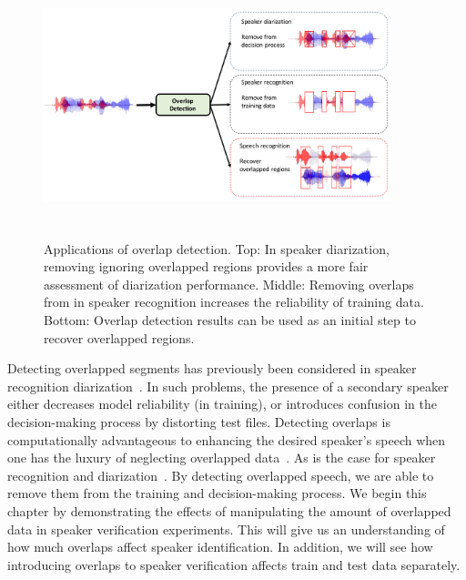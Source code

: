 \begin{figure}[h!]
	\centering
	\vspace{0mm}
	\includegraphics[height = 3in, width=0.9\textwidth]{figures/overlap_detection_applications}
	\vspace{-3mm}
	\caption{Applications of overlap detection. Top: In speaker diarization, removing ignoring overlapped regions provides a more fair assessment of diarization performance. Middle: Removing overlaps from in speaker recognition increases the reliability of training data. Bottom: Overlap detection results can be used as an initial step to recover overlapped regions.}
	\label{fig:overlap_applications}
	\vspace{-3mm}
\end{figure}


Detecting overlapped segments has previously been considered in speaker recognition diarization~\cite{boakye_thesis,yantorno_report}. 
In such problems, the presence of a secondary speaker either decreases model reliability (in training), or introduces confusion in the decision-making process by distorting test files. 
Detecting overlaps is computationally advantageous to enhancing the desired speaker's speech when one has the luxury of neglecting overlapped data~\cite{yantorno_report}. 
As is the case for speaker recognition and diarization~\cite{Boakye_is_08}. 
By detecting overlapped speech, we are able to remove them from the training and decision-making process. 
We begin this chapter by demonstrating the effects of manipulating the amount of overlapped data in speaker verification experiments. 
This will give us an understanding of how much overlaps affect speaker identification. 
In addition, we will see how introducing overlaps to speaker verification affects train and test data separately. 


